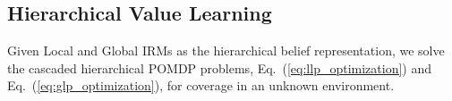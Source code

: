 \documentclass[letterpaper]{article} %
\newcommand{\ph}[1]{{\textbf{#1}:}} %
\begin{document}




\subsection{Hierarchical Value Learning} \label{ssec:belief-planners}

Given Local and Global IRMs as the hierarchical belief representation, we solve the cascaded hierarchical POMDP problems, Eq.~(\ref{eq:llp_optimization}) and Eq.~(\ref{eq:glp_optimization}), for coverage in an unknown environment.
\end{document}
